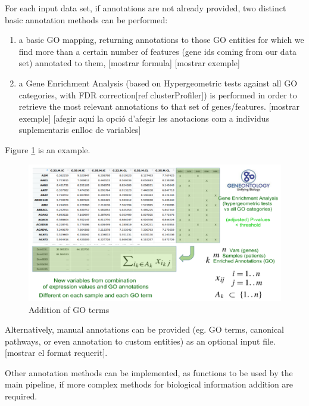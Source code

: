 \documentclass[a4paper, nobind]{templates/ociamthesis}
\begin{document}
For each input data set, if annotations are not already provided, two distinct basic annotation methods can be performed:

\begin{enumerate}
\def\labelenumi{(\roman{enumi})}
\item
  a basic GO mapping, returning annotations to those GO entities for which we find more than a certain number of features (gene ids coming from our data set) annotated to them, {[}mostrar formula{]} {[}mostrar exemple{]}
\item
  a Gene Enrichment Analysis (based on Hypergeometric tests against all GO categories, with FDR correction{[}ref clusterProfiler{]}) is performed in order to retrieve the most relevant annotations to that set of genes/features. {[}mostrar exemple{]}
  {[}afegir aquí la opció d'afegir les anotacions com a individus suplementaris enlloc de variables{]}
\end{enumerate}

Figure \ref{fig:fig3-1} is an example.

\begin{figure}

{\centering \includegraphics[width=0.95\linewidth]{figures/chapter3/3-1_addition_of_GO_terms} 

}

\caption{Addition of GO terms}\label{fig:fig3-1}
\end{figure}

Alternatively, manual annotations can be provided (eg. GO terms, canonical pathways, or even annotation to custom entities) as an optional input file. {[}mostrar el format requerit{]}.

Other annotation methods can be implemented, as functions to be used by the main pipeline, if more complex methods for biological information addition are required.
\end{document}
